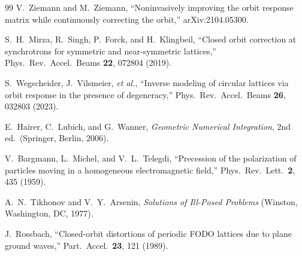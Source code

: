 \documentclass[aps,prab,reprint,superscriptaddress,nofootinbib]{revtex4-2}
\begin{document}
\begin{thebibliography}{99}
		V.~Ziemann and M.~Ziemann,
		``Noninvasively improving the orbit response matrix while continuously
		correcting the orbit,''
		arXiv:2104.05300.

		S.~H.~Mirza, R.~Singh, P.~Forck, and H.~Klingbeil,
		``Closed orbit correction at synchrotrons for symmetric and near-symmetric
		lattices,''
		Phys.\ Rev.\ Accel.\ Beams \textbf{22}, 072804 (2019).

		S.~Wegscheider, J.~Vilsmeier, \emph{et al.},
		``Inverse modeling of circular lattices via orbit response in the presence
		of degeneracy,''
		Phys.\ Rev.\ Accel.\ Beams \textbf{26}, 032803 (2023).

		E.~Hairer, C.~Lubich, and G.~Wanner,
		\emph{Geometric Numerical Integration}, 2nd ed.\ (Springer, Berlin, 2006).

		V.~Bargmann, L.~Michel, and V.~L.~Telegdi,
		``Precession of the polarization of particles moving in a homogeneous
		electromagnetic field,''
		Phys.\ Rev.\ Lett.\ \textbf{2}, 435 (1959).

		A.~N.~Tikhonov and V.~Y.~Arsenin,
		\emph{Solutions of Ill-Posed Problems} (Winston, Washington, DC, 1977).

		J.~Rossbach,
		``Closed-orbit distortions of periodic FODO lattices due to plane ground
		waves,''
		Part.\ Accel.\ \textbf{23}, 121 (1989).

	\end{thebibliography}
\end{document}
